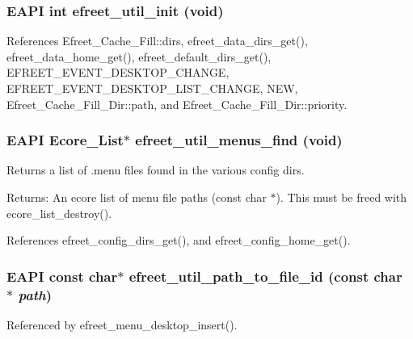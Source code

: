 \subsubsection[efreet\_\-util\_\-init]{\setlength{\rightskip}{0pt plus 5cm}EAPI int efreet\_\-util\_\-init (void)}\label{efreet__utils_8h_0457c008b4cdfac5d753319d0dd65d76}




References Efreet\_\-Cache\_\-Fill::dirs, efreet\_\-data\_\-dirs\_\-get(), efreet\_\-data\_\-home\_\-get(), efreet\_\-default\_\-dirs\_\-get(), EFREET\_\-EVENT\_\-DESKTOP\_\-CHANGE, EFREET\_\-EVENT\_\-DESKTOP\_\-LIST\_\-CHANGE, NEW, Efreet\_\-Cache\_\-Fill\_\-Dir::path, and Efreet\_\-Cache\_\-Fill\_\-Dir::priority.
\subsubsection[efreet\_\-util\_\-menus\_\-find]{\setlength{\rightskip}{0pt plus 5cm}EAPI Ecore\_\-List$\ast$ efreet\_\-util\_\-menus\_\-find (void)}\label{efreet__utils_8h_adad7835d4a548070d11f093a900513d}


Returns a list of .menu files found in the various config dirs. \begin{Desc}
\item[Returns:]An ecore list of menu file paths (const char $\ast$). This must be freed with ecore\_\-list\_\-destroy(). \end{Desc}


References efreet\_\-config\_\-dirs\_\-get(), and efreet\_\-config\_\-home\_\-get().
\subsubsection[efreet\_\-util\_\-path\_\-to\_\-file\_\-id]{\setlength{\rightskip}{0pt plus 5cm}EAPI const char$\ast$ efreet\_\-util\_\-path\_\-to\_\-file\_\-id (const char $\ast$ {\em path})}\label{efreet__utils_8h_e499b43f751ef5d682a480b68ef07d4e}




Referenced by efreet\_\-menu\_\-desktop\_\-insert().
